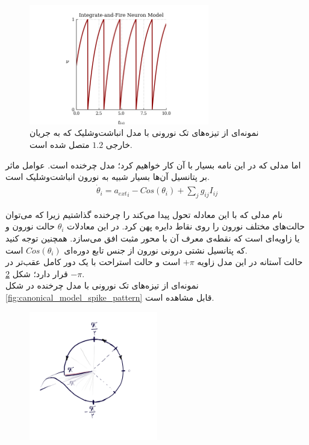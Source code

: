 \begin{figure}
	\centering
	\includegraphics[width=0.7\textwidth]{Figures/IF_model_spike_pattern.png}
	\caption{
		نمونه‌ای از تیزه‌های تک نورونی با مدل انباشت‌وشلیک که به جریان خارجی
	$1.2$
		 متصل شده است.
	}
	\label{fig:IF_model_spike_pattern}
\end{figure}

اما مدلی که در این نامه بسیار با آن کار خواهیم کرد؛ مدل چرخنده است. عوامل ماثر بر پتانسیل آن‌ها بسیار شبیه به نورون انباشت‌وشلیک است.
\begin{align}
	\dot{\theta}_i = {a_{ext}}_i - Cos(\theta_i) + \sum_j g_{ij} I_{ij}
\end{align}

نام مدلی که با این معادله تحول پیدا می‌کند را چرخنده گذاشتیم زیرا که می‌توان حالت‌های مختلف نورون را روی نقاط دایره پهن کرد. در این معادلات 
$\theta_i$
حالت نورون و یا زاویه‌ای است که نقطه‌ی معرف آن با محور مثبت افق می‌سازد. همچنین توجه کنید که پتانسیل نشتی درونی نورون از جنس تابع دوره‌ای
$Cos(\theta_i)$
است.\\
حالت آستانه‌ در این مدل زاویه
$+\pi$
است و حالت استراحت با یک دور کامل عقب‌تر در
$-\pi$
قرار دارد؛ شکل
\ref{fig:rotational_picture}.\\
نمونه‌ای از تیزه‌های تک نورونی با مدل چرخنده در شکل 
\ref{fig:canonical_model_spike_pattern}
قابل مشاهده است.


\begin{figure}
	\centering
	\includegraphics[width=0.5\textwidth]{../Figures/Canonical model.png}
	\caption{}
	\label{fig:rotational_picture}
\end{figure}

